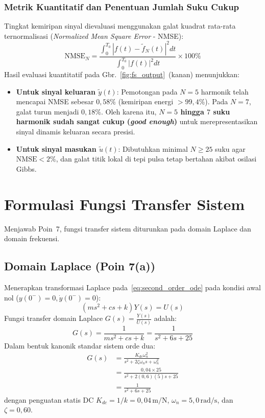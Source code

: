 \documentclass[journal]{IEEEtran}
\begin{document}
\subsubsection{Metrik Kuantitatif dan Penentuan Jumlah Suku Cukup}
Tingkat kemiripan sinyal dievaluasi menggunakan galat kuadrat rata-rata ternormalisasi (\textit{Normalized Mean Square Error} - NMSE):
\begin{equation}
    \text{NMSE}_N = \frac{\int_0^{T_0} |f(t) - \tilde{f}_N(t)|^2 dt}{\int_0^{T_0} |f(t)|^2 dt} \times 100\%
    \label{eq:nmse}
\end{equation}
Hasil evaluasi kuantitatif pada Gbr.~\ref{fig:fs_output}~(kanan) menunjukkan:
\begin{itemize}
    \item \textbf{Untuk sinyal keluaran $\tilde{y}(t)$}: Pemotongan pada $N = 5$ harmonik telah mencapai NMSE sebesar $0{,}58\%$ (kemiripan energi $> 99{,}4\%$). Pada $N = 7$, galat turun menjadi $0{,}18\%$. Oleh karena itu, \textbf{$N = 5$ hingga $7$ suku harmonik sudah sangat cukup (\textit{good enough})} untuk merepresentasikan sinyal dinamis keluaran secara presisi.
    \item \textbf{Untuk sinyal masukan $\tilde{u}(t)$}: Dibutuhkan minimal $N \ge 25$ suku agar $\text{NMSE} < 2\%$, dan galat titik lokal di tepi pulsa tetap bertahan akibat osilasi Gibbs.
\end{itemize}

\section{Formulasi Fungsi Transfer Sistem}
Menjawab Poin~7, fungsi transfer sistem diturunkan pada domain Laplace dan domain frekuensi.

\subsection{Domain Laplace (Poin 7(a))}
Menerapkan transformasi Laplace pada~\eqref{eq:second_order_ode} pada kondisi awal nol ($y(0^-) = 0, \dot{y}(0^-) = 0$):
\begin{equation}
    \left( m s^2 + c s + k \right) Y(s) = U(s)
\end{equation}
Fungsi transfer domain Laplace $G(s) = \frac{Y(s)}{U(s)}$ adalah:
\begin{equation}
    G(s) = \frac{1}{m s^2 + c s + k} = \frac{1}{s^2 + 6s + 25}
    \label{eq:G_s}
\end{equation}
Dalam bentuk kanonik standar sistem orde dua:
\begin{align}
    G(s) &= \frac{K_{dc} \omega_n^2}{s^2 + 2\zeta \omega_n s + \omega_n^2} \nonumber \\
    &= \frac{0{,}04 \times 25}{s^2 + 2(0{,}6)(5)s + 25} \nonumber \\
    &= \frac{1}{s^2 + 6s + 25}
    \label{eq:G_s_canonical}
\end{align}
dengan penguatan statis DC $K_{dc} = 1/k = 0{,}04\,\text{m/N}$, $\omega_n = 5{,}0\,\text{rad/s}$, dan $\zeta = 0{,}60$.
\end{document}
